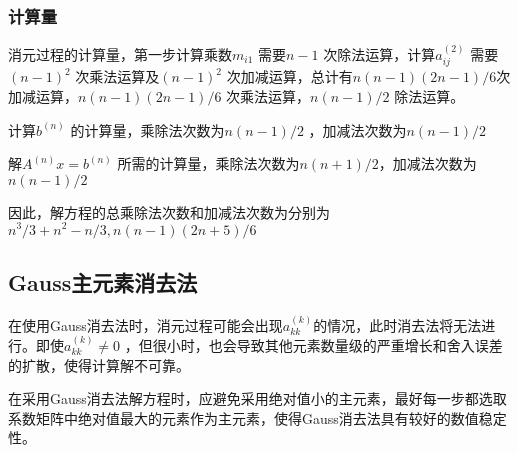 \documentclass[a4paper]{article}
\begin{document}
\subsubsection{计算量}
消元过程的计算量，第一步计算乘数$m_{i1}$ 需要$n-1$ 次除法运算，计算$a_{ij}^{(2)}$ 需要$(n-1)^2$ 次乘法运算及$(n-1)^2$ 次加减运算，总计有$n(n-1)(2n-1)/6$次加减运算，$n(n-1)(2n-1) / 6$ 次乘法运算，$n(n-1)/2$ 除法运算。

计算$b^{(n)}$ 的计算量，乘除法次数为$n(n-1) / 2$ ，加减法次数为$n(n-1) / 2$ 

解$A^{(n)}x = b^{(n)}$ 所需的计算量，乘除法次数为$n(n+1) / 2$，加减法次数为$n(n-1) / 2$

因此，解方程的总乘除法次数和加减法次数为分别为 $n^3 / 3 + n^2 - n / 3, n(n-1)(2n+5) / 6$

\subsection{Gauss主元素消去法}
在使用Gauss消去法时，消元过程可能会出现$a_{kk}^{(k)}$的情况，此时消去法将无法进行。即使$a_{kk}^{(k)} \neq 0$ ，但很小时，也会导致其他元素数量级的严重增长和舍入误差的扩散，使得计算解不可靠。

在采用Gauss消去法解方程时，应避免采用绝对值小的主元素，最好每一步都选取系数矩阵中绝对值最大的元素作为主元素，使得Gauss消去法具有较好的数值稳定性。
\end{document}
